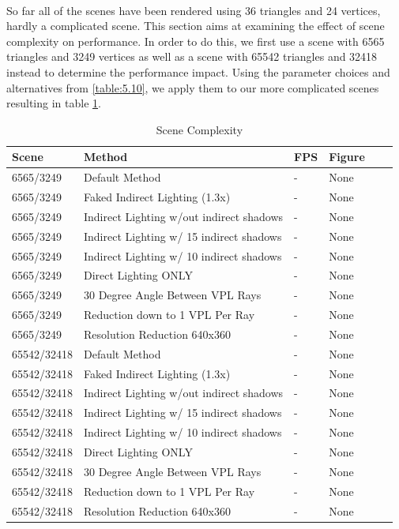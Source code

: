 \paragraph{}
So far all of the scenes have been rendered using 36 triangles and 24 vertices, hardly a complicated scene.  This section aims at examining the effect of scene complexity on performance.  In order to do this, we first use a scene with 6565 triangles and 3249 vertices as well as a scene with 65542 triangles and 32418 instead to determine the performance impact.  Using the parameter choices and alternatives from \ref{table:5.10}, we apply them to our more complicated scenes resulting in table \ref{table:5.11}.

\begin{table}[h!]
	\caption{Scene Complexity}
	\begin{center}
	    \begin{tabular}{ | l | l | l | l | l | l |}
	    \hline
	    Scene & Method & FPS & Figure\\ \hline
	    6565/3249 & Default Method & - & None\\ \hline
	    6565/3249 & Faked Indirect Lighting (1.3x) & - & None\\ \hline
	    6565/3249 & Indirect Lighting w/out indirect shadows & - & None\\ \hline
	    6565/3249 & Indirect Lighting w/ 15 indirect shadows & - & None\\ \hline
	    6565/3249 & Indirect Lighting w/ 10 indirect shadows & - & None\\ \hline
	    6565/3249 & Direct Lighting ONLY & - & None\\ \hline
	    6565/3249 & 30 Degree Angle Between VPL Rays & - & None\\ \hline
	    6565/3249 & Reduction down to 1 VPL Per Ray & - & None\\ \hline
	    6565/3249 & Resolution Reduction 640x360 & - & None\\ \hline
	    \hline
	    \hline
	    65542/32418 & Default Method & - & None\\ \hline
	    65542/32418 & Faked Indirect Lighting (1.3x) & - & None\\ \hline
	    65542/32418 & Indirect Lighting w/out indirect shadows & - & None\\ \hline
	    65542/32418 & Indirect Lighting w/ 15 indirect shadows & - & None\\ \hline
	    65542/32418 & Indirect Lighting w/ 10 indirect shadows & - & None\\ \hline
	    65542/32418 & Direct Lighting ONLY & - & None\\ \hline
	    65542/32418 & 30 Degree Angle Between VPL Rays & - & None\\ \hline
	    65542/32418 & Reduction down to 1 VPL Per Ray & - & None\\ \hline
	    65542/32418 & Resolution Reduction 640x360 & - & None\\ \hline
	    \end{tabular}
	\end{center}
	\label{table:5.11}
\end{table}

